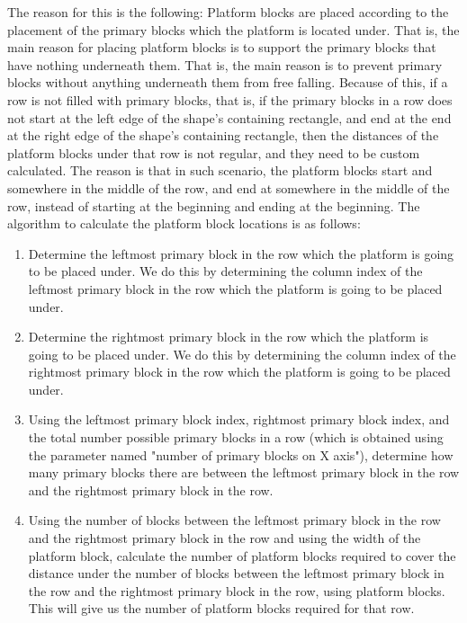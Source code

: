 \documentclass{dalthesis}
\begin{document}
\begin{enumerate}
\begin{enumerate}
    The reason for this is the following: Platform blocks are placed according to the placement of the primary blocks which the platform is located under. That is, the main reason for placing platform blocks is to support the primary blocks that have nothing underneath them. That is, the main reason is to prevent primary blocks without anything underneath them from free falling. Because of this, if a row is not filled with primary blocks, that is, if the primary blocks in a row does not start at the left edge of the shape's containing rectangle, and end at the end at the right edge of the shape's containing rectangle, then the distances of the platform blocks under that row is not regular, and they need to be custom calculated. The reason is that in such scenario, the platform blocks start and somewhere in the middle of the row, and end at somewhere in the middle of the row, instead of starting at the beginning and ending at the beginning. The algorithm to calculate the platform block locations is as follows:

    \begin{enumerate}
      \item Determine the leftmost primary block in the row which the platform is going to be placed under. We do this by determining the column index of the leftmost primary block in the row which the platform is going to be placed under.

      \item Determine the rightmost primary block in the row which the platform is going to be placed under. We do this by determining the column index of the rightmost primary block in the row which the platform is going to be placed under.

      \item Using the leftmost primary block index, rightmost primary block index, and the total number possible primary blocks in a row (which is obtained using the parameter named "number of primary blocks on X axis"), determine how many primary blocks there are between the leftmost primary block in the row and the rightmost primary block in the row.

      \item Using the number of blocks between the leftmost primary block in the row and the rightmost primary block in the row and using the width of the platform block, calculate the number of platform blocks required to cover the distance under the number of blocks between the leftmost primary block in the row and the rightmost primary block in the row, using platform blocks. This will give us the number of platform blocks required for that row.


\end{enumerate}
\end{enumerate}
\end{enumerate}
\end{document}
